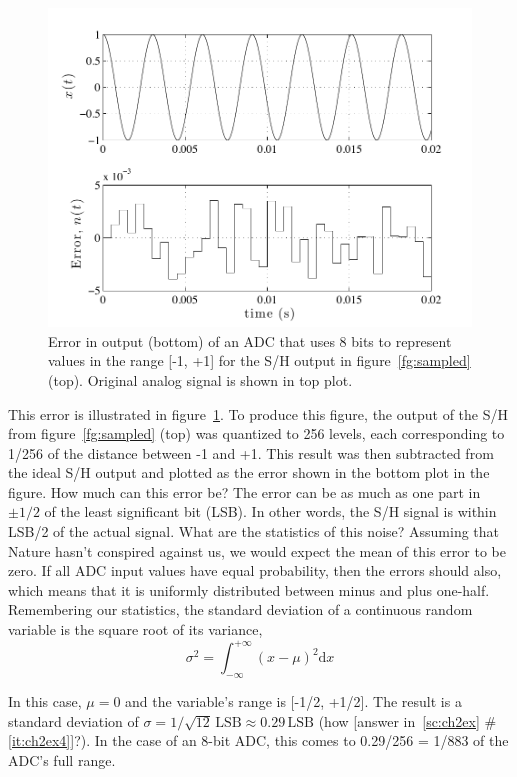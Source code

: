\begin{figure}
\centerline{\includegraphics[width=\textwidth]{ch-computer/quant-error_2000}}
\caption[Error in output for 8-bit ADC]{Error in output (bottom) of an
ADC that uses 8 bits to represent values in the range [-1, +1] for the
S/H output in figure~\protect\ref{fg:sampled} (top). Original analog
signal is shown in top plot.\label{fg:quant2k}}
\end{figure}

This error is illustrated in figure~\ref{fg:quant2k}. To produce this
figure, the output of the S/H from figure~\ref{fg:sampled} (top) was
quantized to 256 levels, each corresponding to 1/256 of the distance
between -1 and +1. This result was then subtracted from the ideal S/H
output and plotted as the error shown in the bottom plot in the
figure. How much can this error be? The error can be as much as one
part in $\pm 1/2$ of the least significant bit  (LSB). In other words, the S/H signal is within LSB/2 of the
actual signal. What are the statistics of this noise? Assuming that Nature hasn't
conspired against us, we would expect the mean of this error to be
zero.  If all ADC input values have equal probability, then the errors
should also, which means that it is uniformly distributed between
minus and plus one-half.  Remembering our statistics, the standard
deviation of a continuous random variable is the square root of its
variance,
\begin{equation}
\sigma^2 = \int_{-\infty}^{+\infty} (x-\mu)^2 \mathrm{d}x
\label{eq:var}
\end{equation}

In this case, $\mu=0$ and the variable's range is [-1/2, +1/2]. The
result is a standard deviation of $\sigma = 1/\sqrt{12} \,
\mathrm{LSB} \approx 0.29
\, \mathrm{LSB}$ (how [answer in~\ref{sc:ch2ex}
\#\ref{it:ch2ex4}]?). In the case of an 8-bit ADC, this
comes to 0.29/256 = 1/883 of the ADC's full range.

